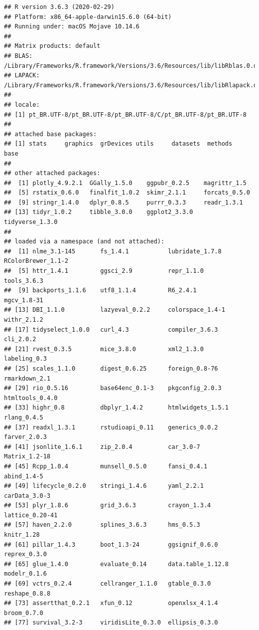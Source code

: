\documentclass[]{article}
\begin{document}
\begin{verbatim}
## R version 3.6.3 (2020-02-29)
## Platform: x86_64-apple-darwin15.6.0 (64-bit)
## Running under: macOS Mojave 10.14.6
## 
## Matrix products: default
## BLAS:   /Library/Frameworks/R.framework/Versions/3.6/Resources/lib/libRblas.0.dylib
## LAPACK: /Library/Frameworks/R.framework/Versions/3.6/Resources/lib/libRlapack.dylib
## 
## locale:
## [1] pt_BR.UTF-8/pt_BR.UTF-8/pt_BR.UTF-8/C/pt_BR.UTF-8/pt_BR.UTF-8
## 
## attached base packages:
## [1] stats     graphics  grDevices utils     datasets  methods   base     
## 
## other attached packages:
##  [1] plotly_4.9.2.1  GGally_1.5.0    ggpubr_0.2.5    magrittr_1.5   
##  [5] rstatix_0.6.0   finalfit_1.0.2  skimr_2.1.1     forcats_0.5.0  
##  [9] stringr_1.4.0   dplyr_0.8.5     purrr_0.3.3     readr_1.3.1    
## [13] tidyr_1.0.2     tibble_3.0.0    ggplot2_3.3.0   tidyverse_1.3.0
## 
## loaded via a namespace (and not attached):
##  [1] nlme_3.1-145       fs_1.4.1           lubridate_1.7.8    RColorBrewer_1.1-2
##  [5] httr_1.4.1         ggsci_2.9          repr_1.1.0         tools_3.6.3       
##  [9] backports_1.1.6    utf8_1.1.4         R6_2.4.1           mgcv_1.8-31       
## [13] DBI_1.1.0          lazyeval_0.2.2     colorspace_1.4-1   withr_2.1.2       
## [17] tidyselect_1.0.0   curl_4.3           compiler_3.6.3     cli_2.0.2         
## [21] rvest_0.3.5        mice_3.8.0         xml2_1.3.0         labeling_0.3      
## [25] scales_1.1.0       digest_0.6.25      foreign_0.8-76     rmarkdown_2.1     
## [29] rio_0.5.16         base64enc_0.1-3    pkgconfig_2.0.3    htmltools_0.4.0   
## [33] highr_0.8          dbplyr_1.4.2       htmlwidgets_1.5.1  rlang_0.4.5       
## [37] readxl_1.3.1       rstudioapi_0.11    generics_0.0.2     farver_2.0.3      
## [41] jsonlite_1.6.1     zip_2.0.4          car_3.0-7          Matrix_1.2-18     
## [45] Rcpp_1.0.4         munsell_0.5.0      fansi_0.4.1        abind_1.4-5       
## [49] lifecycle_0.2.0    stringi_1.4.6      yaml_2.2.1         carData_3.0-3     
## [53] plyr_1.8.6         grid_3.6.3         crayon_1.3.4       lattice_0.20-41   
## [57] haven_2.2.0        splines_3.6.3      hms_0.5.3          knitr_1.28        
## [61] pillar_1.4.3       boot_1.3-24        ggsignif_0.6.0     reprex_0.3.0      
## [65] glue_1.4.0         evaluate_0.14      data.table_1.12.8  modelr_0.1.6      
## [69] vctrs_0.2.4        cellranger_1.1.0   gtable_0.3.0       reshape_0.8.8     
## [73] assertthat_0.2.1   xfun_0.12          openxlsx_4.1.4     broom_0.7.0       
## [77] survival_3.2-3     viridisLite_0.3.0  ellipsis_0.3.0
\end{verbatim}
\end{document}
